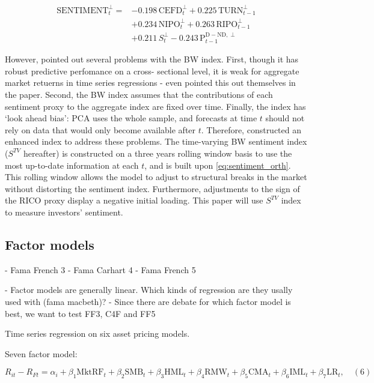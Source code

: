 \begin{equation} %
    \label{eq:sentiment_orth}
    \begin{split}
    \text{SENTIMENT}^{\perp}_t = &-0.198\,\text{CEFD}^{\perp}_t + 0.225\,\text{TURN}^{\perp}_{t-1} \\
    &+ 0.234\,\text{NIPO}^{\perp}_t + 0.263\,\text{RIPO}^{\perp}_{t-1} \\
    &+ 0.211\,S^{\perp}_t - 0.243\,\text{P}^{\text{D} - \text{ND},\perp}_{t-1}
    \end{split}
\end{equation}

However,  pointed out several problems with the BW index. First, though it has robust predictive perfomance on a cross- sectional level, it is weak for aggregate market retuerns in time series regressions - even  pointed this out themselves in the paper. Second, the BW index assumes that the contributions of each sentiment proxy to the aggregate index are fixed over time. Finally, the index has `look ahead bias': PCA uses the whole sample, and forecasts at time $t$ should not rely on data that would only become available after $t$. Therefore,  constructed an enhanced index to address these problems. The time-varying BW sentiment index ($S^{TV}$ hereafter) is constructed on a three years rolling window basis to use the most up-to-date information at each $t$, and is built upon \cref{eq:sentiment_orth}. This rolling window allows the model to adjust to structural breaks in the market without distorting the sentiment index. Furthermore, adjustments to the sign of the RICO proxy display a negative initial loading. This paper will use  $S^{TV}$ index to measure investors' sentiment.


\subsection{Factor models}
- Fama French 3
- Fama Carhart 4
- Fama French 5

- Factor models are generally linear. Which kinds of regression are they usally used with (fama macbeth)? 
- Since there are debate for which factor model is best, we want to test FF3, C4F and FF5

Time series regression on six asset pricing models.

Seven factor model:

\[
R_{it} - R_{Ft} = \alpha_i + \beta_1 \text{MktRF}_t + \beta_2 \text{SMB}_t + \beta_3 \text{HML}_t + \beta_4 \text{RMW}_t + \beta_5 \text{CMA}_t + \beta_6 \text{IML}_t + \beta_7 \text{LR}_t, \quad (6)
\]

